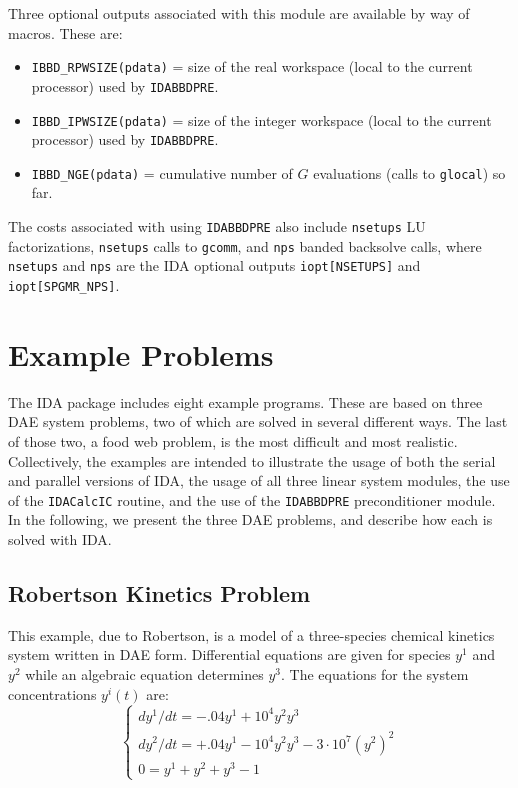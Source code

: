 \documentclass[11pt]{article}
\begin{document}
Three optional outputs associated with this module are available by way of
macros. These are:

\begin{itemize}

\item  {\tt IBBD\_RPWSIZE(pdata)} = size of the real workspace (local to
the current processor) used by {\tt IDABBDPRE}.

\item  {\tt IBBD\_IPWSIZE(pdata)} = size of the integer workspace (local to
the current processor) used by {\tt IDABBDPRE}.

\item  {\tt IBBD\_NGE(pdata)} = cumulative number of $G$ evaluations (calls
to {\tt glocal}) so far.

\end{itemize}
The costs associated with using {\tt IDABBDPRE} also include {\tt nsetups}
LU factorizations, {\tt nsetups} calls to {\tt gcomm}, and {\tt nps}
banded backsolve calls, where {\tt nsetups} and {\tt nps} are the IDA
optional outputs {\tt iopt[NSETUPS]} and {\tt iopt[SPGMR\_NPS]}.


\section{Example Problems}

The IDA package includes eight example programs.  These are based on
three DAE system problems, two of which are solved in several
different ways.  The last of those two, a food web problem, is the most 
difficult and most realistic.  Collectively, the examples are intended 
to illustrate the usage of both the serial and parallel versions of IDA, 
the usage of all three linear system modules, the use of the {\tt IDACalcIC}
routine, and the use of the {\tt IDABBDPRE} preconditioner module.  In
the following, we present the three DAE problems, and describe how
each is solved with IDA.


\subsection{Robertson Kinetics Problem}

This example, due to Robertson, is a model of a three-species 
chemical kinetics system written in DAE form. Differential equations are given 
for species $y^1$ and $y^2$ while an algebraic equation determines $y^3$. The 
equations for the system concentrations $y^i(t)$ are:
\begin{equation}
\left\{ \begin{array}{l}
               dy^1/dt = -.04 y^1 + 10^4 y^2 y^3   \\
               dy^2/dt = +.04 y^1 - 10^4 y^2 y^3 - 3 \cdot 10^7 (y^2)^2  \\
               0 =  y^1 + y^2 + y^3 - 1
\end{array} \right.                                       \label{robsys}
\end{equation}
\end{document}
